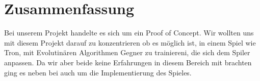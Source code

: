 \section{Zusammenfassung}

Bei unserem Projekt handelte es sich um ein Proof of Concept. Wir wollten uns mit diesem Projekt darauf zu konzentrieren ob es möglich ist, in einem Spiel wie Tron, mit Evolutinären Algorithmen Gegner zu trainiereni, die sich dem Spiler anpassen. Da wir aber beide keine Erfahrungen in diesem Bereich mit brachten ging es neben bei auch um die Implementierung des Spieles. 
